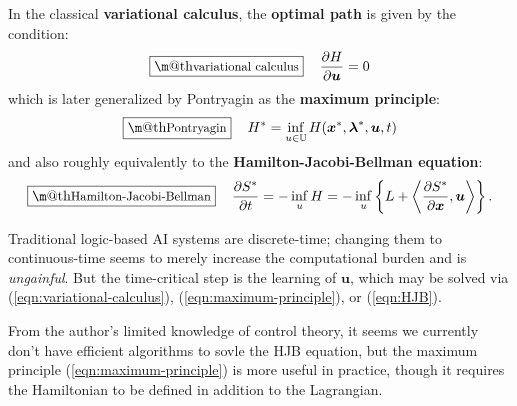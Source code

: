 \documentclass[orivec]{llncs}
\makeatletter
\newcommand{\emp}[1]{\textbf{#1}}
\newcommand{\vect}[1]{\boldsymbol{#1}}
\renewcommand{\boxed}[1]{\fbox{\m@th$\displaystyle\scalebox{0.9}{#1}$} \,}
\makeatother
\begin{document}

In the classical \textbf{variational calculus}, the \textbf{optimal path} is given by the condition:
\begin{equation}
\label{eqn:variational-calculus}
\boxed{\mbox{variational calculus}} \quad
\frac{\partial H}{\partial \vect{u}} = 0
\end{equation}
which is later generalized by Pontryagin as the \textbf{maximum principle}:
\begin{equation}
\label{eqn:maximum-principle}
\boxed{\mbox{Pontryagin}} \quad
H^* = \inf_{u \in \mathbb{U}} H(\vect{x}^*, \vect{\lambda}^*, \vect{u}, t)
\end{equation}
and also roughly equivalently to the \textbf{Hamilton-Jacobi-Bellman equation}:
\begin{equation}
\label{eqn:HJB}
\boxed{\mbox{Hamilton-Jacobi-Bellman}} \quad
\frac{\partial S^*}{\partial t} = -\inf_u H = -\inf_u \left\{ L + \bigg\langle \frac{\partial S^*}{\partial \vect{x}}, \vect{u} \bigg\rangle \right\} .
\end{equation}

Traditional logic-based AI systems are discrete-time; changing them to continuous-time seems to merely increase the computational burden and is \textit{ungainful}.  But the time-critical step is the learning of $\vect{u}$, which may be solved via (\ref{eqn:variational-calculus}), (\ref{eqn:maximum-principle}), or (\ref{eqn:HJB}).  

From the author's limited knowledge of control theory, it seems we currently don't have efficient algorithms to sovle the HJB equation, but the maximum principle (\ref{eqn:maximum-principle}) is more useful in practice, though it requires the Hamiltonian to be defined in addition to the Lagrangian.
\end{document}
